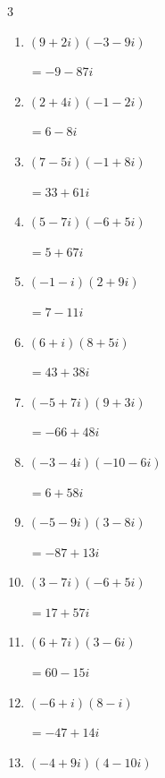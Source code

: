 \begin{multicols}{3}
\begin{enumerate}
        $\displaystyle =-3-51i$

  \item $\displaystyle (9+2i)(-3-9i)$

        $\displaystyle =-9-87i$

\columnbreak %

\resetques

  \item $\displaystyle (2+4i)(-1-2i)$

        $\displaystyle =6-8i$

  \item $\displaystyle (7-5i)(-1+8i)$

        $\displaystyle =33+61i$

  \item $\displaystyle (5-7i)(-6+5i)$

        $\displaystyle =5+67i$

  \item $\displaystyle (-1-i)(2+9i)$

        $\displaystyle =7-11i$

  \item $\displaystyle (6+i)(8+5i)$

        $\displaystyle =43+38i$

  \item $\displaystyle (-5+7i)(9+3i)$

        $\displaystyle =-66+48i$

  \item $\displaystyle (-3-4i)(-10-6i)$

        $\displaystyle =6+58i$

  \item $\displaystyle (-5-9i)(3-8i)$

        $\displaystyle =-87+13i$

  \item $\displaystyle (3-7i)(-6+5i)$

        $\displaystyle =17+57i$

  \item $\displaystyle (6+7i)(3-6i)$

        $\displaystyle =60-15i$

  \item $\displaystyle (-6+i)(8-i)$

        $\displaystyle =-47+14i$

  \item $\displaystyle (-4+9i)(4-10i)$


\end{enumerate}
\end{multicols}
